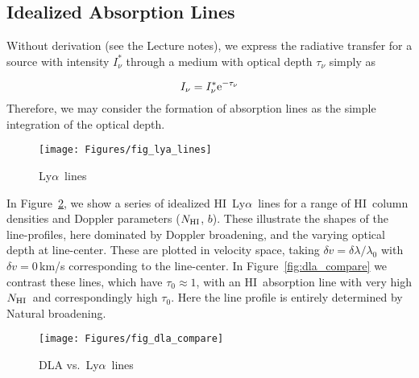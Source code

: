\documentclass[graybox]{svmult}
\newcommand{\HI}{H{\sc I}}
\def\lya{Ly$\alpha$}
\def\rme{{\rm e}}
\newcommand{\mnhi}{N_{\rm HI}}
\newcommand{\nhi}{$\mnhi$}
\begin{document}
\subsection{Idealized Absorption Lines}

Without derivation (see the Lecture notes),
we express the radiative transfer for a source with
intensity $I^*_\nu$ through a medium with
optical depth $\tau_\nu$ simply as

\begin{equation}
I_\nu = I_\nu^* \rme^{-\tau_\nu}
\end{equation}
Therefore, we may consider the formation of absorption lines as the 
simple integration of the optical depth.

%
\begin{figure}[b]
\texttt{[image: Figures/fig\_lya\_lines]}
%
%
\caption{\lya\ lines
}
\label{fig:lyalines}       %
\end{figure}


In Figure~\ref{fig:lyalines}, we show a series of idealized \HI\ \lya\
lines for a range of \HI\ column densities and Doppler parameters
(\nhi, $b$).  These illustrate the shapes of the line-profiles, here
dominated by Doppler broadening, and the varying optical depth
at line-center.  These are plotted in velocity space, taking
$\delta v = \delta \lambda / \lambda_0$ with 
$\delta v=0$\,km/s corresponding to the line-center.  
In Figure~\ref{fig:dla_compare}
we contrast these lines, which have $\tau_0 \approx 1$, with 
an \HI\ absorption line with very high \nhi\ and correspondingly
high $\tau_0$.  Here the line profile is entirely determined
by Natural broadening.

%
\begin{figure}[b]
\texttt{[image: Figures/fig\_dla\_compare]}
%
%
\caption{DLA vs.\ \lya\ lines
}
\label{fig:lyalines}       %
\end{figure}
\end{document}
